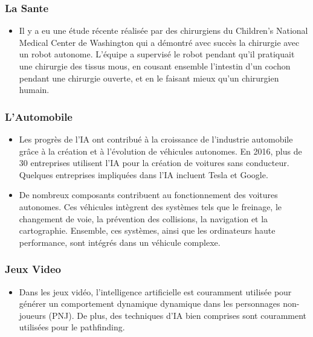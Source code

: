 \documentclass{beamer}
\begin{document}
 	
 		\begin{frame}
 	   \frametitle{La Sante}
 	   \begin{itemize}
 	   \item Il y a eu une étude récente réalisée par des chirurgiens du Children's National Medical Center de Washington qui a démontré avec succès la chirurgie avec un robot autonome. L'équipe a supervisé le robot pendant qu'il pratiquait une chirurgie des tissus mous, en cousant ensemble l'intestin d'un cochon pendant une chirurgie ouverte, et en le faisant mieux qu'un chirurgien humain.
 	   \end{itemize}
 	 \end{frame}
 	
 	
 	\begin{frame}
 	   \frametitle{L'Automobile}
 	   \begin{itemize}
 	       \item Les progrès de l'IA ont contribué à la croissance de l'industrie automobile grâce à la création et à l'évolution de véhicules autonomes. En 2016, plus de 30 entreprises utilisent l'IA pour la création de voitures sans conducteur. Quelques entreprises impliquées dans l'IA incluent Tesla et Google.
 	       
 	       \item De nombreux composants contribuent au fonctionnement des voitures autonomes. Ces véhicules intègrent des systèmes tels que le freinage, le changement de voie, la prévention des collisions, la navigation et la cartographie. Ensemble, ces systèmes, ainsi que les ordinateurs haute performance, sont intégrés dans un véhicule complexe.
 	   \end{itemize}
 	\end{frame}
 	
 	
 	\begin{frame}
 	   \frametitle{Jeux Video}
 	   \begin{itemize}
 	       \item Dans les jeux vidéo, l'intelligence artificielle est couramment utilisée pour générer un comportement dynamique dynamique dans les personnages non-joueurs (PNJ). De plus, des techniques d'IA bien comprises sont couramment utilisées pour le pathfinding.
 	   \end{itemize}
 	\end{frame}
\end{document}

